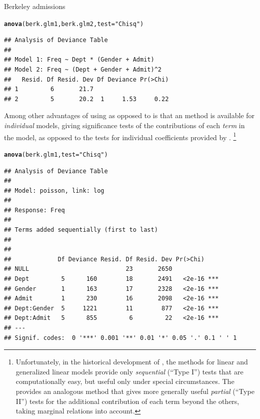 \documentclass[11pt]{book}\usepackage[]{graphicx}\usepackage[]{color}
\makeatletter
\newcommand{\hlstr}[1]{\textcolor[rgb]{0.192,0.494,0.8}{#1}}%
\newcommand{\hlstd}[1]{\textcolor[rgb]{0.345,0.345,0.345}{#1}}%
\newcommand{\hlkwc}[1]{\textcolor[rgb]{0.333,0.667,0.333}{#1}}%
\newcommand{\hlkwd}[1]{\textcolor[rgb]{0.737,0.353,0.396}{\textbf{#1}}}%
\newenvironment{kframe}{%
 \def\at@end@of@kframe{}%
 \ifinner\ifhmode%
  \def\at@end@of@kframe{\end{minipage}}%
  \begin{minipage}{\columnwidth}%
 \fi\fi%
 \def\FrameCommand##1{\hskip\@totalleftmargin \hskip-\fboxsep
 \colorbox{shadecolor}{##1}\hskip-\fboxsep
     \hskip-\linewidth \hskip-\@totalleftmargin \hskip\columnwidth}%
 \MakeFramed {\advance\hsize-\width
   \@totalleftmargin\z@ \linewidth\hsize
   \@setminipage}}%
 {\par\unskip\endMakeFramed%
 \at@end@of@kframe}
\newenvironment{knitrout}{}{} %
\renewenvironment{knitrout}{\small\renewcommand{\baselinestretch}{.85}}{} %
\makeatother
\begin{document}
\begin{Example}[berkeley6]{Berkeley admissions}
\begin{knitrout}
\color{fgcolor}\begin{kframe}
\begin{alltt}
\hlkwd{anova}\hlstd{(berk.glm1, berk.glm2,} \hlkwc{test}\hlstd{=}\hlstr{"Chisq"}\hlstd{)}
\end{alltt}
\begin{verbatim}
## Analysis of Deviance Table
## 
## Model 1: Freq ~ Dept * (Gender + Admit)
## Model 2: Freq ~ (Dept + Gender + Admit)^2
##   Resid. Df Resid. Dev Df Deviance Pr(>Chi)
## 1         6       21.7                     
## 2         5       20.2  1     1.53     0.22
\end{verbatim}
\end{kframe}
\end{knitrout}

Among other advantages of using  as opposed to  is that
an  method is available for \emph{individual}  models, giving
significance tests of the contributions of each \emph{term} in the model,
as opposed to the tests for individual coefficients provided by .%
\footnote{
Unfortunately, in the historical development of \R, the  methods for
linear and generalized linear
models provide only \emph{sequential} (``Type I'') tests that are computationally easy,
but useful only under special circumstances.  The  provides
an analogous  method that gives more generally useful
\emph{partial} (``Type II'') tests
for the additional contribution of each term beyond the others,
taking marginal relations into account.
}
\begin{knitrout}
\color{fgcolor}\begin{kframe}
\begin{alltt}
\hlkwd{anova}\hlstd{(berk.glm1,} \hlkwc{test}\hlstd{=}\hlstr{"Chisq"}\hlstd{)}
\end{alltt}
\begin{verbatim}
## Analysis of Deviance Table
## 
## Model: poisson, link: log
## 
## Response: Freq
## 
## Terms added sequentially (first to last)
## 
## 
##             Df Deviance Resid. Df Resid. Dev Pr(>Chi)    
## NULL                           23       2650             
## Dept         5      160        18       2491   <2e-16 ***
## Gender       1      163        17       2328   <2e-16 ***
## Admit        1      230        16       2098   <2e-16 ***
## Dept:Gender  5     1221        11        877   <2e-16 ***
## Dept:Admit   5      855         6         22   <2e-16 ***
## ---
## Signif. codes:  0 '***' 0.001 '**' 0.01 '*' 0.05 '.' 0.1 ' ' 1
\end{verbatim}
\end{kframe}
\end{knitrout}


\end{Example}
\end{document}
